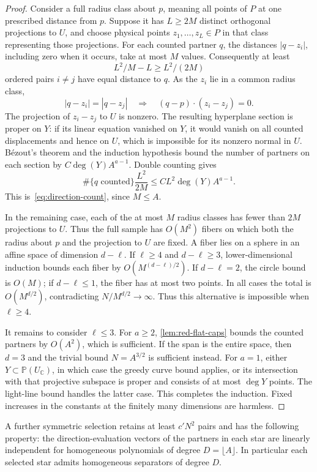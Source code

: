 \begin{proof}
Consider a full radius class about $p$, meaning all points of $P$ at one prescribed distance from $p$. Suppose it has $L\ge2M$ distinct orthogonal projections to $U$, and choose physical points $z_1,\ldots,z_L\in P$ in that class representing those projections. For each counted partner $q$, the distances $|q-z_i|$, including zero when it occurs, take at most $M$ values. Consequently at least
\[
 L^2/M-L\ge L^2/(2M)
\]
ordered pairs $i\ne j$ have equal distance to $q$. As the $z_i$ lie in a common radius class,
\[
 |q-z_i|=|q-z_j|
 \quad\Longrightarrow\quad
 (q-p)\cdot(z_i-z_j)=0.
\]
The projection of $z_i-z_j$ to $U$ is nonzero. The resulting hyperplane section is proper on $Y$: if its linear equation vanished on $Y$, it would vanish on all counted displacements and hence on $U$, which is impossible for its nonzero normal in $U$. B\'ezout's theorem and the induction hypothesis bound the number of partners on each section by $C\deg(Y)A^{a-1}$. Double counting gives
\[
 \#\{q\text{ counted}\}\frac{L^2}{2M}
 \le C L^2\deg(Y)A^{a-1}.
\]
This is~\eqref{eq:direction-count}, since $M\le A$.

In the remaining case, each of the at most $M$ radius classes has fewer than $2M$ projections to $U$. Thus the full sample has $O(M^2)$ fibers on which both the radius about $p$ and the projection to $U$ are fixed. A fiber lies on a sphere in an affine space of dimension $d-\ell$. If $\ell\ge4$ and $d-\ell\ge3$, lower-dimensional induction bounds each fiber by $O(M^{(d-\ell)/2})$. If $d-\ell=2$, the circle bound is $O(M)$; if $d-\ell\le1$, the fiber has at most two points. In all cases the total is $O(M^{d/2})$, contradicting $N/M^{d/2}\to\infty$. Thus this alternative is impossible when $\ell\ge4$.

It remains to consider $\ell\le3$. For $a\ge2$, \cref{lem:red-flat-caps} bounds the counted partners by $O(A^2)$, which is sufficient. If the span is the entire space, then $d=3$ and the trivial bound $N=A^{3/2}$ is sufficient instead. For $a=1$, either $Y\subset\mathbb{P}(U_{\mathbb{C}})$, in which case the greedy curve bound applies, or its intersection with that projective subspace is proper and consists of at most $\deg Y$ points. The light-line bound handles the latter case. This completes the induction. Fixed increases in the constants at the finitely many dimensions are harmless.
\end{proof}

\begin{proposition}
\label{prop:red-independent-stars}
A further symmetric selection retains at least $c'N^2$ pairs and has the following property: the direction-evaluation vectors of the partners in each star are linearly independent for homogeneous polynomials of degree $D=\lfloor A\rfloor$. In particular each selected star admits homogeneous separators of degree $D$.
\end{proposition}

